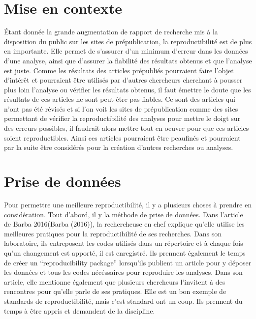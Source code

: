 \documentclass[9pt,twocolumn,twoside,]{pnas-new}
\begin{document}
\hypertarget{mise-en-contexte}{%
\section{Mise en contexte}\label{mise-en-contexte}}

Étant donnée la grande augmentation de rapport de recherche mis à la
disposition du public sur les sites de prépublication, la
reproductibilité est de plus en importante. Elle permet de s'assurer
d'un minimum d'erreur dans les données d'une analyse, ainsi que
d'assurer la fiabilité des résultats obtenus et que l'analyse est juste.
Comme les résultats des articles prépubliés pourraient faire l'objet
d'intérêt et pourraient être utilisés par d'autres chercheurs cherchant
à pousser plus loin l'analyse ou vérifier les résultats obtenus, il faut
émettre le doute que les résultats de ces articles ne sont peut-être pas
fiables. Ce sont des articles qui n'ont pas été révisés et si l'on voit
les sites de prépublication comme des sites permettant de vérifier la
reproductibilité des analyses pour mettre le doigt sur des erreurs
possibles, il faudrait alors mettre tout en oeuvre pour que ces articles
soient reproductibles. Ainsi ces articles pourraient être peaufinés et
pourraient par la suite être considérés pour la création d'autres
recherches ou analyses.

\hypertarget{prise-de-donnuxe9es}{%
\section{Prise de données}\label{prise-de-donnuxe9es}}

Pour permettre une meilleure reproductibilité, il y a plusieurs choses à
prendre en considération. Tout d'abord, il y la méthode de prise de
données. Dans l'article de Barba 2016(Barba (2016)), la rechercheuse en
chef explique qu'elle utilise les meilleures pratiques pour la
reproductibilité de ses recherches. Dans son laboratoire, ils
entreposent les codes utilisés dans un répertoire et à chaque fois qu'un
changement est apporté, il est enregistré. Ils prennent également le
temps de créer un ``reproducibility package'' lorsqu'ils publient un
article pour y déposer les données et tous les codes nécéssaires pour
reproduire les analyses. Dans son article, elle mentionne également que
plusieurs chercheurs l'invitent à des rencontres pour qu'elle parle de
ses pratiques. Elle est un bon exemple de standards de reproductibilité,
mais c'est standard ont un coup. Ils prennent du temps à être appris et
demandent de la discipline.
\end{document}
